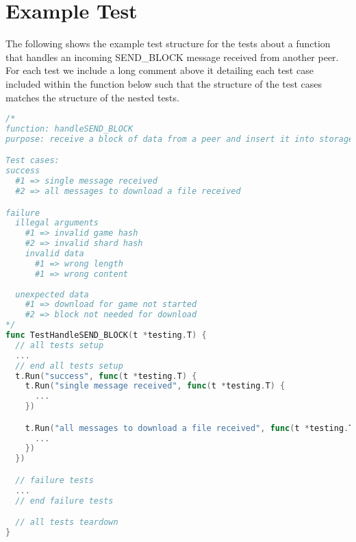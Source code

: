 \newpage\section{Example Test}\label{app:ex-test}

The following shows the example test structure for the tests about a function that handles an incoming SEND\_BLOCK message received from another peer. For each test we include a long comment above it detailing each test case included within the function below such that the structure of the test cases matches the structure of the nested tests.

\begin{lstlisting}[language=go, caption={An example test case used for the handleSEND\_BLOCK function}]
/*
function: handleSEND_BLOCK
purpose: receive a block of data from a peer and insert it into storage

Test cases:
success
  #1 => single message received
  #2 => all messages to download a file received

failure
  illegal arguments
    #1 => invalid game hash
    #2 => invalid shard hash
    invalid data
      #1 => wrong length
      #1 => wrong content
      
  unexpected data
    #1 => download for game not started
    #2 => block not needed for download
*/
func TestHandleSEND_BLOCK(t *testing.T) {
  // all tests setup
  ...
  // end all tests setup
  t.Run("success", func(t *testing.T) {
    t.Run("single message received", func(t *testing.T) {
      ...
    })

    t.Run("all messages to download a file received", func(t *testing.T) {
      ...
    })
  })

  // failure tests
  ...
  // end failure tests

  // all tests teardown
}
\end{lstlisting}